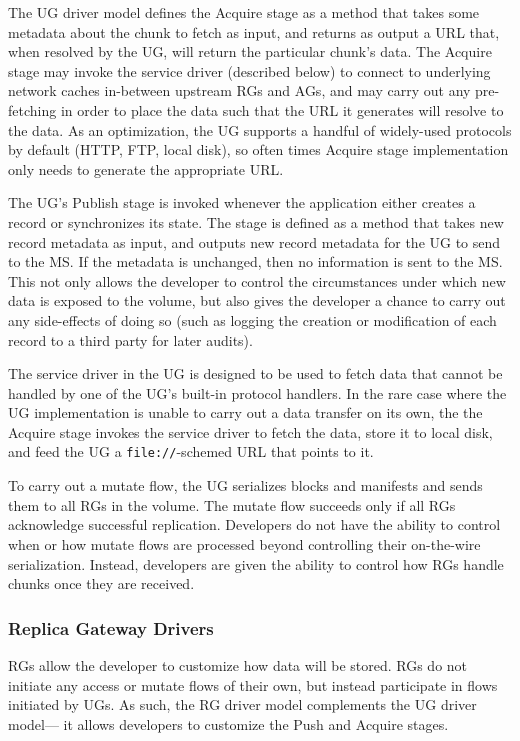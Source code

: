 The UG driver model defines the Acquire stage as a method that takes some
metadata about the chunk to fetch as input, and returns as output a
URL that, when resolved by the UG, will return the particular chunk's data.
The Acquire stage may invoke the service driver (described below) to connect to
underlying network caches in-between upstream RGs and AGs, and may carry out any
pre-fetching in order to place the data such that the URL it generates will
resolve to the data.  As an optimization, the
UG supports a handful of widely-used protocols by default (HTTP, FTP, local
disk), so often times Acquire stage implementation only needs to
generate the appropriate URL.

The UG's Publish stage is invoked whenever the application either creates a
record or synchronizes its state.  The stage is defined as a
method that takes new record metadata as input, and outputs new record metadata for the UG to
send to the MS.  If the metadata is unchanged, then no information is sent to
the MS.  This not only allows the developer to control the circumstances under which
new data is exposed to the volume, but also gives the developer a chance to
carry out any side-effects of doing so (such as logging the creation or
modification of each record to a third party for later audits).

  The service driver in the UG is designed to
be used to fetch data that cannot be handled by one of the UG's built-in
protocol handlers.  In the rare case where the UG implementation is unable to carry out
a data transfer on its own, the the Acquire stage 
invokes the service driver to fetch the data, store it to local disk, and feed the UG a
\texttt{file://}-schemed URL that points to it.

To carry out a mutate flow, the UG serializes blocks and manifests and sends them to all RGs
in the volume.  The mutate flow succeeds only if all RGs
acknowledge successful replication.  Developers do not have the ability to
control when or how mutate flows are processed beyond controlling their
on-the-wire serialization.  Instead, developers are given the
ability to control how RGs handle chunks once they are received.

\subsubsection{Replica Gateway Drivers}

RGs allow the developer to customize how data will be stored.  RGs do not
initiate any access or mutate flows of their own, but instead participate in
flows initiated by UGs.  As such, the RG driver model complements the UG driver model---
it allows developers to customize the Push and Acquire stages.


